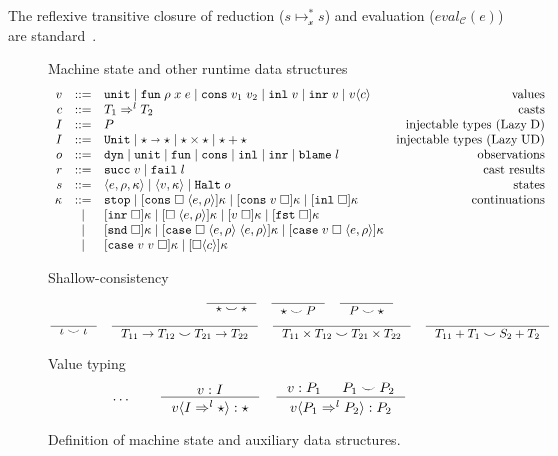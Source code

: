 \documentclass[acmsmall,review,anonymous]{acmart}\settopmatter{printfolios=true,printccs=false,printacmref=false}
\newcommand{\stxrule}[3]{#1 & ::= & #3 & \text{#2}\\}
\newcommand{\stxrulecont}[1]{& | & #1 & \\}
\newcommand{\plus}[0]{+}
\newcommand{\lazyUD}{Lazy\;UD}
\newcommand{\lazyD}{Lazy\;D}
\newcommand{\sOOinspect}[3]{\langle#1,#2,#3\rangle}
\newcommand{\sOOreturn}[2]{\langle#1,#2\rangle}
\newcommand{\sOOhalt}[1]{\mathtt{Halt} \; #1}
\newcommand{\TOOdyn}[0]{\star}
\newcommand{\POOunit}[0]{\mathtt{Unit}}
\newcommand{\POOfun}[2]{#1 \shortrightarrow #2}
\newcommand{\cOOcast}[3]{#1 \Rightarrow^{#2} #3}
\newcommand{\oOOinj}{\mathtt{dyn}}
\newcommand{\oOOsole}{\mathtt{unit}}
\newcommand{\oOOfun}{\mathtt{fun}}
\newcommand{\oOOcons}{\mathtt{cons}}
\newcommand{\oOOinl}{\mathtt{inl}}
\newcommand{\oOOinr}{\mathtt{inr}}
\newcommand{\oOOblame}[1]{\mathtt{blame} \; #1}
\newcommand{\vOOcast}[2]{#1\langle#2\rangle}
\newcommand{\vOOfun}[3]{\mathtt{fun} \; #1 \; #2 \; #3}
\newcommand{\vOOtt}[0]{\mathtt{unit}}
\newcommand{\vOOcons}[2]{\mathtt{cons}\;#1\;#2}
\newcommand{\vOOinl}[1]{\mathtt{inl}\;#1}
\newcommand{\vOOinr}[1]{\mathtt{inr}\;#1}
\newcommand{\rOOsucc}[1]{\mathtt{succ}\;#1}
\newcommand{\rOOfail}[1]{\mathtt{fail}\;#1}
\newcommand{\kOOmt}[0]{\mathtt{stop}}
\newcommand{\kOOconsI}[3]{[\mathtt{cons} \; \square \; \langle#1,#2\rangle ]#3}
\newcommand{\kOOconsII}[2]{[\mathtt{cons} \; #1 \; \square]#2}
\newcommand{\kOOinl}[1]{[\mathtt{inl}\; \square]#1}
\newcommand{\kOOinr}[1]{[\mathtt{inr}\; \square]#1}
\newcommand{\kOOappI}[3]{
  [\square \; \langle#1,#2\rangle]#3
}
\newcommand{\kOOappII}[2]{
  [#1 \; \square]#2}
\newcommand{\kOOcar}[1]{[\mathtt{fst} \; \square]#1}
\newcommand{\kOOcdr}[1]{[\mathtt{snd} \; \square]#1}
\newcommand{\kOOcaseI}[4]{
  [\mathtt{case} \; \square \; \langle#1,#3\rangle \; \langle#2,#3\rangle ]#4}
\newcommand{\kOOcaseII}[4]{
  [\mathtt{case} \; #1 \; \square \; \langle#2,#3\rangle ]#4}
\newcommand{\kOOcaseIII}[3]{
  [\mathtt{case} \; #1 \; #2 \; \square]#3}
\newcommand{\kOOcast}[2]{
  [\square \langle #1 \rangle]#2}
\newcommand{\judgeCreduceTrans}[2]{#1 \longmapsto_{\mathcal{x}}^{*} #2}
\begin{document}
The reflexive transitive closure of reduction ($\judgeCreduceTrans{s}{s}$) and 
evaluation ($eval_\mathcal{C}(e)$)
are standard~\citep{felleisen03:_pllc}.


\begin{figure}
  Machine state and other runtime data structures
  \[
  \begin{array}{rclr}
  \stxrule{v}{values}{
    \vOOtt{} \mid
    \vOOfun{\rho}{x}{e} \mid
    \vOOcons{v_1}{v_2} \mid
    \vOOinl{v} \mid
    \vOOinr{v} \mid   
    \vOOcast{v}{c}
  }
  \stxrule{c}{casts}{
    \cOOcast{T_1}{l}{T_2}
  }
  \stxrule{I}{injectable types (\lazyD)}{
    P
  }
  \stxrule{I}{injectable types (\lazyUD)}{
    \POOunit \mid
    \POOfun{\star}{\star} \mid
    \star \times \star \mid
    \star + \star
  }
  \stxrule{o}{observations}{
    \oOOinj \mid
    \oOOsole \mid
    \oOOfun \mid
    \oOOcons \mid
    \oOOinl \mid
    \oOOinr \mid
    \oOOblame{l}
  }
  \stxrule{r}{cast results}{
    \rOOsucc{v} \mid
    \rOOfail{l}
  }
  \stxrule{s}{states}{
    \sOOinspect{e}{\rho}{\kappa} \mid{}
    \sOOreturn{v}{\kappa} \mid{}
    \sOOhalt{o}
  }
  \stxrule{\kappa}{continuations}{
    \kOOmt \mid
    \kOOconsI{e}{\rho}{\kappa} \mid
    \kOOconsII{v}{\kappa} \mid
    \kOOinl{\kappa}
  }
  \stxrulecont{
    \kOOinr{\kappa} \mid
    \kOOappI{e}{\rho}{\kappa} \mid
    \kOOappII{v}{\kappa} \mid
    \kOOcar{\kappa}
  }
  \stxrulecont{ 
    \kOOcdr{\kappa}\mid
    \kOOcaseI{e}{e}{\rho}{\kappa}\mid
    \kOOcaseII{v}{e}{\rho}{\kappa}
  }
  \stxrulecont{
    \kOOcaseIII{v}{v}{\kappa} \mid
    \kOOcast{c}{\kappa}
  }
  \end{array}
  \]

        Shallow-consistency
  \begin{gather*}
  \inference{}{
    \star \smile \star
  } \quad
  \inference{}{
    \star \smile P
  } \quad
  \inference{}{
    P \smile \star
  } \\
  \inference{}{
    \iota \smile \iota
  } \quad
  \inference{}{
    T_{11} \rightarrow T_{12} \smile T_{21} \rightarrow T_{22}
  } \quad
  \inference{}{
    T_{11} \times T_{12} \smile T_{21} \times T_{22}
  } \quad
  \inference{}{
  T_{11} \plus T_1 \smile S_2 \plus T_2
  }
  \end{gather*}
  
  Value typing 
  \begin{gather*}
  \dots \qquad
  \inference{
    v : I
  }{
    \vOOcast{v}{\cOOcast{I}{l}{\TOOdyn}} : \TOOdyn
  }
  \quad
  \inference{
    v : P_1 &
    P_1 \smile P_2
  }{
    \vOOcast{v}{\cOOcast{P_1}{l}{P_2}} : P_2
  }
  \end{gather*}
        \caption{Definition of machine state and auxiliary data
          structures.}
        \label{fig:state}
\end{figure}
\end{document}
